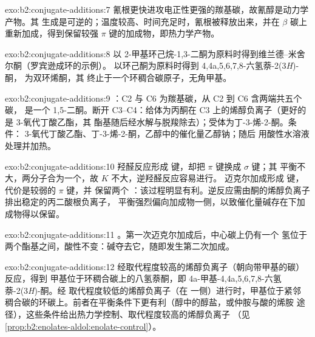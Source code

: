 \begin{solution}{exo:b2:conjugate-additions:7}
氰根更快进攻电正性更强的羰基碳，故氰醇是动力学产物。其
生成是可逆的；温度较高、时间充足时，氰根被释放出来，并在
$\beta$ 碳上重新加成，得到保留较强  $\pi$ 键的加成物，即热力学产物。
\end{solution}

\begin{solution}{exo:b2:conjugate-additions:8}
以 2-甲基环己烷-1,3-二酮为原料时得到维兰德–米舍尔酮（罗宾逊成环的示例）。
以环己酮为原料时得到 4,4a,5,6,7,8-六氢萘-2(3\textit{H})-酮，
为双环烯酮，其  终止于一个环稠合碳原子，无角甲基。
\end{solution}

\begin{solution}{exo:b2:conjugate-additions:9}
：C2 与 C6 为羰基碳，从 C2 到 C6 含两端共五个碳，
是一个 1,5-二酮。断开 C3--C4：给体为丙酮在 C3 上的烯醇负离子（更好的是 3-氧代丁酸乙酯，其
酯基随后经水解与脱羧除去）；受体为丁-3-烯-2-酮。条件：
3-氧代丁酸乙酯、丁-3-烯-2-酮，乙醇中的催化量乙醇钠；随后
用酸性水溶液处理并加热。
\end{solution}

\begin{solution}{exo:b2:conjugate-additions:10}
羟醛反应形成  键，却把  $\pi$ 键换成  $\sigma$ 键；其
平衡不大，两分子合为一个，故 $K$ 不大，逆羟醛反应容易进行。
迈克尔加成形成  键，代价是较弱的  $\pi$ 键，并
保留两个 ：该过程明显有利。逆反应需由酮的烯醇负离子排出稳定的丙二酸根负离子，
平衡强烈偏向加成物一侧，以致催化量碱存在下加成物得以保留。
\end{solution}

\begin{solution}{exo:b2:conjugate-additions:11}
。第一次迈克尔加成后，中心碳上仍有一个
氢位于两个酯基之间，酸性不变：碱夺去它，随即发生第二次加成。
\end{solution}

\begin{solution}{exo:b2:conjugate-additions:12}
经取代程度较高的烯醇负离子（朝向带甲基的碳）反应，得到
甲基位于环稠合碳上的八氢萘酮，即 4a-甲基-4,4a,5,6,7,8-六氢萘-2(3\textit{H})-酮。经
取代程度较低的烯醇负离子（在  一侧）进行时，甲基位于紧邻
稠合碳的环碳上。前者在平衡条件下更有利（醇中的醇盐，或仲胺与酸的烯胺
途径），这些条件给出热力学控制、取代程度较高的烯醇负离子
（见\cref{prop:b2:enolates-aldol:enolate-control}）。
\end{solution}

